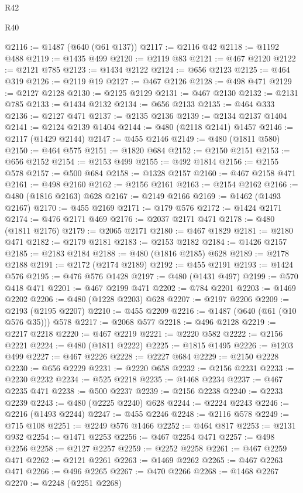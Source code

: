 \begin{lexlean}{R42}
\begin{lexlean}{R40}
\begin{coremodule}
{{{{{{{{{{{{{{{{{{{{{{{{{{{{{{{{{{{{{{{{{{{{{{{{{{{{{{{{{{{{{{{{{{{{{{{{{{{{{{{{{{{{{{{{{{{{{{{{{{{{{{{{{{{{{@2116 := @1487 (@640 (@61 @137))
@2117 := @2116 @42
@2118 := @1192 @488
@2119 := @1435 @499
@2120 := @2119 @83
@2121 := @467 @2120
@2122 := @2121 @785
@2123 := @1434 @2122
@2124 := @656 @2123
@2125 := @464 @319
@2126 := @2119 @19
@2127 := @467 @2126
@2128 := @498 @471
@2129 := @2127 @2128
@2130 := @2125 @2129
@2131 := @467 @2130
@2132 := @2131 @785
@2133 := @1434 @2132
@2134 := @656 @2133
@2135 := @464 @333
@2136 := @2127 @471
@2137 := @2135 @2136
@2139 := @2134 @2137 @1404
@2141 := @2124 @2139 @1404
@2144 := @480 (@2118 @2141) @1457
@2146 := @2117 (@1429 @2144)
@2147 := @455 @2146
@2149 := @480 (@1811 @580)
@2150 := @464 @575
@2151 := @1820 @684
@2152 := @2150 @2151
@2153 := @656 @2152
@2154 := @2153 @499
@2155 := @492 @1814
@2156 := @2155 @578
@2157 := @500 @684
@2158 := @1328 @2157
@2160 := @467 @2158 @471
@2161 := @498 @2160
@2162 := @2156 @2161
@2163 := @2154 @2162
@2166 := @480 (@1816 @2163) @628
@2167 := @2149 @2166
@2169 := @1462 (@1493 @2167)
@2170 := @455 @2169
@2171 := @179 @576
@2172 := @1424 @2171
@2174 := @476 @2171 @469
@2176 := @2037 @2171 @471
@2178 := @480 (@1811 @2176)
@2179 := @2065 @2171
@2180 := @467 @1829
@2181 := @2180 @471
@2182 := @2179 @2181
@2183 := @2153 @2182
@2184 := @1426 @2157
@2185 := @2183 @2184
@2188 := @480 (@1816 @2185) @628
@2189 := @2178 @2188
@2191 := @2172 (@2174 @2189)
@2192 := @455 @2191
@2193 := @1424 @576
@2195 := @476 @576 @1428
@2197 := @480 (@1431 @497)
@2199 := @570 @418 @471
@2201 := @467 @2199 @471
@2202 := @784 @2201
@2203 := @1469 @2202
@2206 := @480 (@1228 @2203) @628
@2207 := @2197 @2206
@2209 := @2193 (@2195 @2207)
@2210 := @455 @2209
@2216 := @1487 (@640 (@61 (@10 @576 @35))) @578
@2217 := @2068 @577
@2218 := @496 @2128
@2219 := @2217 @2218
@2220 := @467 @2219
@2221 := @2220 @582
@2222 := @2156 @2221
@2224 := @480 (@1811 @2222)
@2225 := @1815 @1495
@2226 := @1203 @499
@2227 := @467 @2226
@2228 := @2227 @684
@2229 := @2150 @2228
@2230 := @656 @2229
@2231 := @2220 @658
@2232 := @2156 @2231
@2233 := @2230 @2232
@2234 := @525 @2218
@2235 := @1468 @2234
@2237 := @467 @2235 @471
@2238 := @500 @2237
@2239 := @2156 @2238
@2240 := @2233 @2239
@2243 := @480 (@2225 @2240) @628
@2244 := @2224 @2243
@2246 := @2216 (@1493 @2244)
@2247 := @455 @2246
@2248 := @2116 @578
@2249 := @715 @108
@2251 := @2249 @576 @1466
@2252 := @464 @817
@2253 := @2131 @932
@2254 := @1471 @2253
@2256 := @467 @2254 @471
@2257 := @498 @2256
@2258 := @2127 @2257
@2259 := @2252 @2258
@2261 := @467 @2259 @471
@2262 := @2121 @2261
@2263 := @1469 @2262
@2265 := @467 @2263 @471
@2266 := @496 @2265
@2267 := @470 @2266
@2268 := @1468 @2267
@2270 := @2248 (@2251 @2268)
}}}}}}}}}}}}}}}}}}}}}}}}}}}}}}}}}}}}}}}}}}}}}}}}}}}}}}}}}}}}}}}}}}}}}}}}}}}}}}}}}}}}}}}}}}}}}}}}}}}}}}}}}}}}}
\end{coremodule}
\end{lexlean}
\end{lexlean}

